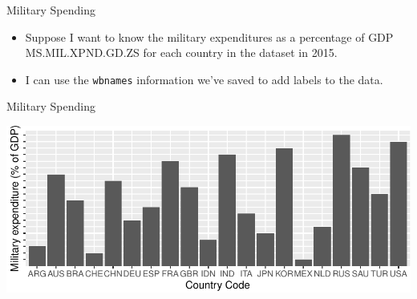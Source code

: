 \documentclass[10pt,ignorenonframetext,]{beamer}
\newenvironment{Shaded}{\begin{snugshade}}{\end{snugshade}}
\newcommand{\DataTypeTok}[1]{\textcolor[rgb]{0.13,0.29,0.53}{#1}}
\newcommand{\DecValTok}[1]{\textcolor[rgb]{0.00,0.00,0.81}{#1}}
\newcommand{\KeywordTok}[1]{\textcolor[rgb]{0.13,0.29,0.53}{\textbf{#1}}}
\newcommand{\NormalTok}[1]{#1}
\newcommand{\OperatorTok}[1]{\textcolor[rgb]{0.81,0.36,0.00}{\textbf{#1}}}
\newcommand{\StringTok}[1]{\textcolor[rgb]{0.31,0.60,0.02}{#1}}
\begin{document}
\begin{frame}[fragile]{Military Spending}
\protect\hypertarget{military-spending}{}

\begin{itemize}
\item
  Suppose I want to know the military expenditures as a percentage of
  GDP MS.MIL.XPND.GD.ZS for each country in the dataset in 2015.
\item
  I can use the \texttt{wbnames} information we've saved to add labels
  to the data.
\end{itemize}

\begin{Shaded}
\end{Shaded}

\end{frame}

\begin{frame}{Military Spending}
\protect\hypertarget{military-spending-1}{}

\includegraphics{PresentationTidyData_files/figure-beamer/unnamed-chunk-15-1.pdf}

\end{frame}
\end{document}

